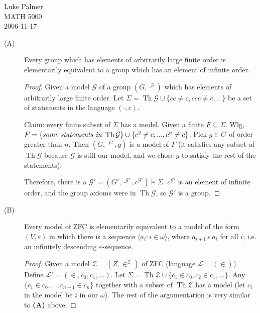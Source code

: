 \documentclass[12pt]{article}
\DeclareMathOperator{\theory}{Th}
\begin{document}
\noindent Luke Palmer \\
MATH 5000 \\
2006-11-17

\begin{description}
\item[(A)] Every group which has elements of arbitrarily large finite
order is elementarily equivalent to a group which has an element of
infinite order.
  \begin{proof}
	Given a model $\mathcal{G}$ of a group $(G,\cdot^\mathcal{G})$ which
	has elements of arbitrarily large finite order. Let $\Sigma =
	\theory{\mathcal{G}} \cup \{ cc \ne c, ccc \ne c, ... \}$ be a set
	of statements in the language $(\cdot, c)$.  
	
	Claim: every finite subset of $\Sigma$ has a model.  Given a finite
	$F \subseteq \Sigma$.  Wlg, $F = \{ \text{\it some statements in }
	\theory{\mathcal{G}} \} \cup \{ c^2 \ne c, ..., c^n \ne c \}$.  Pick
	$g \in G$ of order greater than $n$.  Then $(G, \cdot^G, g)$ is a
	model of $F$ (it satisfies any subset of $\theory{\mathcal{G}}$
	because $\mathcal{G}$ is still our model, and we chose $g$ to
	satisfy the rest of the statements).

	Therefore, there is a $\mathcal{G'} =
	(G',\cdot^{\mathcal{G'}},c^{\mathcal{G'}}) \models \Sigma$.
	$c^\mathcal{G'}$ is an element of infinite order, and the group
	axioms were in $\theory{\mathcal{G}}$, so $\mathcal{G'}$ is a group.
  \end{proof}

\item[(B)] Every model of ZFC is elementarily equivalent to a model of
the form $(V, \varepsilon)$ in which there is a sequence $\langle a_i :
i \in \omega \rangle$, where $a_{i+1}\,\varepsilon\,a_i$ for all $i$;
i.e. an infinitely descending $\varepsilon$-sequence.
  \begin{proof}
	Given a model $\mathcal{Z} = (Z, \in^\mathcal{Z})$ of ZFC (language
	$\mathcal{L} = (\in)$).  Define $\mathcal{L'} = (\in, c_0,
	c_1, ...)$.  Let $\Sigma = \theory{\mathcal{Z}} \cup \{ c_1 \in c_0,
	c_2 \in c_1, ... \}$.  Any $\{ c_1 \in c_0, ..., c_{n+1} \in c_n \}$
	together with a subset of $\theory{\mathcal{Z}}$ has a model (let
	$c_i$ in the model be $i$ in our $\omega$).  The rest of the
	argumentation is very similar to \textbf{(A)} above.
  \end{proof}


\end{description}
\end{document}

